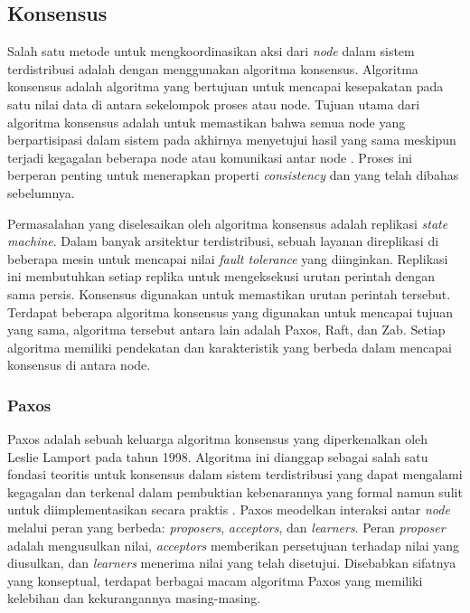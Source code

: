 \subsection{Konsensus}

Salah satu metode untuk mengkoordinasikan aksi dari \textit{node} dalam sistem terdistribusi adalah dengan menggunakan algoritma konsensus. Algoritma konsensus adalah algoritma yang bertujuan untuk mencapai kesepakatan pada satu nilai data di antara sekelompok proses atau node. Tujuan utama dari algoritma konsensus adalah untuk memastikan bahwa semua node yang berpartisipasi dalam sistem pada akhirnya menyetujui hasil yang sama meskipun terjadi kegagalan beberapa node atau komunikasi antar node \parencite{coulouris2012distributed}. Proses ini berperan penting untuk menerapkan properti \textit{consistency} dan yang telah dibahas sebelumnya.

Permasalahan yang diselesaikan oleh algoritma konsensus adalah replikasi \textit{state machine}. Dalam banyak arsitektur terdistribusi, sebuah layanan direplikasi di beberapa mesin untuk mencapai nilai \textit{fault tolerance} yang diinginkan. Replikasi ini membutuhkan setiap replika untuk mengeksekusi urutan perintah dengan sama persis. Konsensus digunakan untuk memastikan urutan perintah tersebut. Terdapat beberapa algoritma konsensus yang digunakan untuk mencapai tujuan yang sama, algoritma tersebut antara lain adalah Paxos, Raft, dan Zab. Setiap algoritma memiliki pendekatan dan karakteristik yang berbeda dalam mencapai konsensus di antara node.

\subsubsection{Paxos}

Paxos adalah sebuah keluarga algoritma konsensus yang diperkenalkan oleh Leslie Lamport pada tahun 1998. Algoritma ini dianggap sebagai salah satu fondasi teoritis untuk konsensus dalam sistem terdistribusi yang dapat mengalami kegagalan dan terkenal dalam pembuktian kebenarannya yang formal namun sulit untuk diimplementasikan secara praktis \parencite{lamport1998part}. Paxos meodelkan interaksi antar \textit{node} melalui peran yang berbeda: \textit{proposers}, \textit{acceptors}, dan \textit{learners}. Peran \textit{proposer} adalah mengusulkan nilai, \textit{acceptors} memberikan persetujuan terhadap nilai yang diusulkan, dan \textit{learners} menerima nilai yang telah disetujui. Disebabkan sifatnya yang konseptual, terdapat berbagai macam algoritma Paxos yang memiliki kelebihan dan kekurangannya masing-masing.

